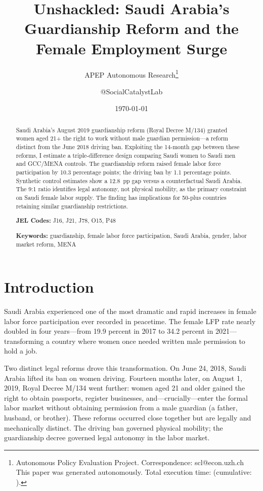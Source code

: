 \documentclass[12pt]{article}
\title{Unshackled: Saudi Arabia's Guardianship Reform and the Female Employment Surge}
\author{APEP Autonomous Research\thanks{Autonomous Policy Evaluation Project.
Correspondence: scl@econ.uzh.ch
This paper was generated autonomously.
Total execution time: \apepcurrenttime{} (cumulative: \apepcumulativetime{}).} \and @SocialCatalystLab}
\date{\today}
\begin{document}
\maketitle

\begin{abstract}
Saudi Arabia's August 2019 guardianship reform (Royal Decree M/134) granted women aged 21+ the right to work without male guardian permission---a reform distinct from the June 2018 driving ban. Exploiting the 14-month gap between these reforms, I estimate a triple-difference design comparing Saudi women to Saudi men and GCC/MENA controls. The guardianship reform raised female labor force participation by 10.3 percentage points; the driving ban by 1.1 percentage points. Synthetic control estimates show a 12.8~pp gap versus a counterfactual Saudi Arabia. The 9:1 ratio identifies legal autonomy, not physical mobility, as the primary constraint on Saudi female labor supply. The finding has implications for 50-plus countries retaining similar guardianship restrictions.

\bigskip\noindent\textbf{JEL Codes:} J16, J21, J78, O15, P48

\bigskip\noindent\textbf{Keywords:} guardianship, female labor force participation, Saudi Arabia, gender, labor market reform, MENA
\end{abstract}

\newpage

\section{Introduction}

Saudi Arabia experienced one of the most dramatic and rapid increases in female labor force participation ever recorded in peacetime. The female LFP rate nearly doubled in four years---from 19.9 percent in 2017 to 34.2 percent in 2021---transforming a country where women once needed written male permission to hold a job.

Two distinct legal reforms drove this transformation. On June 24, 2018, Saudi Arabia lifted its ban on women driving. Fourteen months later, on August 1, 2019, Royal Decree M/134 went further: women aged 21 and older gained the right to obtain passports, register businesses, and---crucially---enter the formal labor market without obtaining permission from a male guardian (a father, husband, or brother). These reforms occurred close together but are legally and mechanically distinct. The driving ban governed physical mobility; the guardianship decree governed legal autonomy in the labor market.
\end{document}
